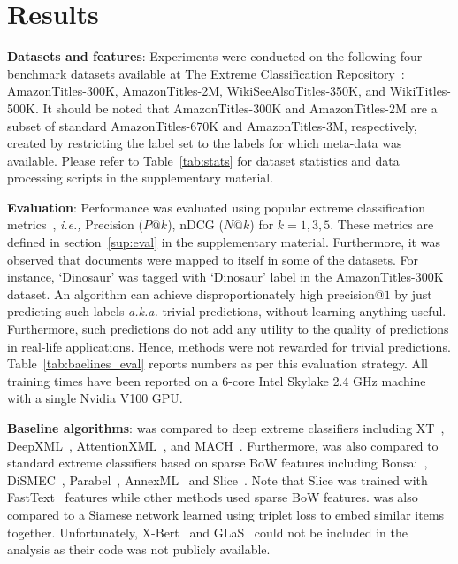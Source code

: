 \section{Results}
\label{sec:results}


\textbf{Datasets and features}: Experiments were conducted on the following four benchmark datasets available at The Extreme Classification Repository~\cite{XMLRepo}: AmazonTitles-300K, AmazonTitles-2M, WikiSeeAlsoTitles-350K, and WikiTitles-500K. It should be noted that AmazonTitles-300K and AmazonTitles-2M are a subset of standard AmazonTitles-670K and AmazonTitles-3M, respectively, created by restricting the label set to the labels for which meta-data was available. Please refer to Table~\ref{tab:stats} for dataset statistics and data processing scripts in the supplementary material.

\textbf{Evaluation}: Performance was evaluated using popular extreme classification metrics~\cite{Babbar19, Prabhu14, Prabhu18b, dahiya2020, You18, Liu17}, {\it i.e.,} Precision ($P@k$), nDCG ($N@k$) for $k= 1, 3, 5$. These metrics are defined in section~\ref{sup:eval} in the supplementary material. Furthermore, it was observed that documents were mapped to itself in some of the datasets. For instance, `Dinosaur' was tagged with `Dinosaur' label in the AmazonTitles-300K dataset. An algorithm can achieve disproportionately high precision@$1$ by just predicting such labels {\it a.k.a.} trivial predictions, without learning anything useful. Furthermore, such predictions do not add any utility to the quality of predictions in real-life applications. Hence, methods were not rewarded for trivial predictions. Table~\ref{tab:baelines_eval} reports numbers as per this evaluation strategy. All training times have been reported on a 6-core Intel Skylake 2.4 GHz machine with a single Nvidia V100 GPU.

\textbf{Baseline algorithms}: \alg was compared to deep extreme classifiers including XT~\cite{Wydmuch18}, DeepXML~\cite{dahiya2020}, AttentionXML~\cite{You18}, and MACH~\cite{Medini2019}. Furthermore, \alg was also compared to standard extreme classifiers based on sparse BoW features including Bonsai~\cite{Khandagale19}, DiSMEC~\cite{Babbar17}, Parabel~\cite{Prabhu18b}, AnnexML~\cite{Tagami17} and Slice~\cite{Jain19}. Note that Slice was trained with FastText~\cite{Bojanowski16} features while other methods used sparse BoW features. \alg was also compared to a Siamese network learned using triplet loss to embed similar items together. Unfortunately, X-Bert~\citep{Chang19} and GLaS~\citep{Guo2019} could not be included in the analysis as their code was not publicly available.

